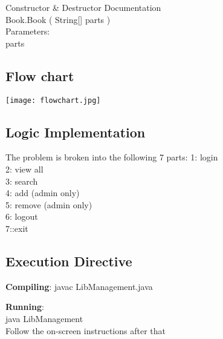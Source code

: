\documentclass[paper=a4, fontsize=11pt]{scrartcl} %
\numberwithin{equation}{section} %
\numberwithin{figure}{section} %
\numberwithin{table}{section} %
\begin{document}
Constructor \& Destructor Documentation\\
Book.Book	(	String[] 	parts	)	\\
Parameters:\\
parts	\\

\newpage
\subsection{Flow chart}
 {\center\texttt{[image: flowchart.jpg]}}


\subsection{Logic Implementation}
The problem is broken into the following 7 parts:
1: login\\
2: view all\\
3: search\\
4: add (admin only)\\
5: remove (admin only)\\
6: logout\\
7::exit\\

\subsection{Execution Directive}
\textbf{Compiling}:
javac LibManagement.java

\textbf{Running}:\\
java LibManagement\\

Follow the on-screen instructions after that
\end{document}
